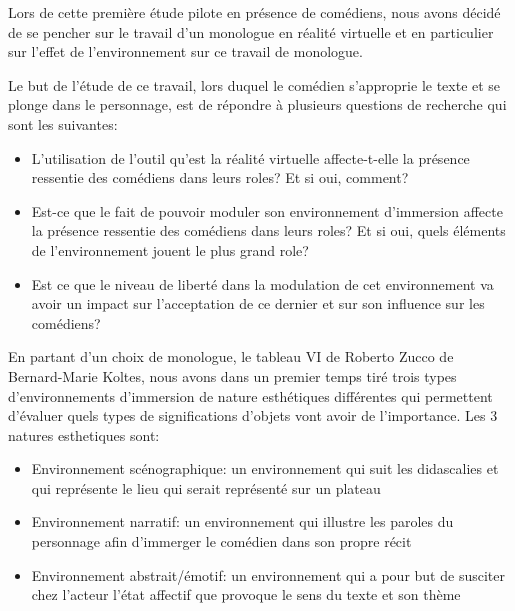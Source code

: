Lors de cette première étude pilote en présence de comédiens, 
nous avons décidé de se pencher sur le travail d'un monologue en
réalité virtuelle et en particulier sur l'effet de l'environnement 
sur ce travail de monologue. 

Le but de l'étude de ce travail, lors duquel le comédien s'approprie le texte et se plonge dans 
le personnage, est de répondre à plusieurs questions de recherche qui sont les suivantes: 

\begin{itemize}
    \item L'utilisation de l'outil qu'est la réalité virtuelle affecte-t-elle la présence ressentie des comédiens dans leurs roles? Et si oui, comment?
    \item Est-ce que le fait de pouvoir moduler son environnement d'immersion affecte la présence ressentie des comédiens dans leurs roles? Et si oui, quels éléments de l'environnement jouent le plus grand role?
    \item Est ce que le niveau de liberté dans la modulation de cet environnement va avoir un impact sur l'acceptation de ce dernier et sur son influence sur les comédiens? 
\end{itemize}

En partant d'un choix de monologue, le tableau VI de Roberto Zucco de Bernard-Marie
Koltes, nous avons dans un premier temps tiré trois types d'environnements d'immersion 
de nature esthétiques différentes qui permettent d'évaluer quels types de significations 
d'objets vont avoir de l'importance. Les 3 natures esthetiques sont: 
\begin{itemize}
    \item Environnement scénographique: un environnement qui suit les didascalies et qui représente le lieu qui serait représenté sur un plateau
    \item Environnement narratif: un environnement qui illustre les paroles du personnage afin d'immerger le comédien dans son propre récit
    \item Environnement abstrait/émotif: un environnement qui a pour but de susciter chez l'acteur l'état affectif que provoque le sens du texte et son thème 
\end{itemize}

